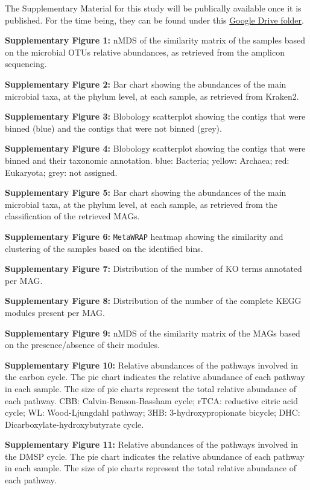    The Supplementary Material for this study will be publically available once it is published. 
   For the time being, they can be found under this \href{https://drive.google.com/drive/folders/1eQiXxsUPJ4QuIFxa1g5dWFw0CySuYvKD?usp=sharing}{Google Drive folder}.

   \textbf{Supplementary Figure 1:} nMDS of the similarity matrix of the samples based on the microbial OTUs relative abundances, as retrieved from the amplicon sequencing. 

   \textbf{Supplementary Figure 2:} Bar chart showing the abundances of the main microbial taxa, at the phylum level, at each sample, as retrieved from Kraken2. 

   \textbf{Supplementary Figure 3:} Blobology scatterplot showing the contigs that were binned (blue) and the contigs that were not binned (grey). 

   \textbf{Supplementary Figure 4:} Blobology scatterplot showing the contigs that were binned and their taxonomic annotation. blue: Bacteria; yellow: Archaea; red: Eukaryota; grey: not assigned. 

   \textbf{Supplementary Figure 5:} Bar chart showing the abundances of the main microbial taxa, at the phylum level, at each sample, as retrieved from the classification of the retrieved MAGs.

   \textbf{Supplementary Figure 6:} \texttt{MetaWRAP} heatmap showing the similarity and clustering of the samples based on the identified bins.  

   \textbf{Supplementary Figure 7:} Distribution of the number of KO terms annotated per MAG. 

   \textbf{Supplementary Figure 8:} Distribution of the number of the complete KEGG modules present per MAG. 

   \textbf{Supplementary Figure 9:} nMDS of the similarity matrix of the MAGs based on the presence/absence of their modules. 

   \textbf{Supplementary Figure 10:} Relative abundances of the pathways involved in the carbon cycle. The pie chart indicates the relative abundance of each pathway in each sample. The size of pie charts represent the total relative abundance of each pathway. 
                                    CBB: Calvin-Benson-Bassham cycle; rTCA: reductive citric acid cycle; WL: Wood-Ljungdahl pathway; 3HB: 3-hydroxypropionate bicycle; DHC: Dicarboxylate-hydroxybutyrate cycle.

   \textbf{Supplementary Figure 11:} Relative abundances of the pathways involved in the DMSP cycle. The pie chart indicates the relative abundance of each pathway in each sample. The size of pie charts represent the total relative abundance of each pathway. 
    
